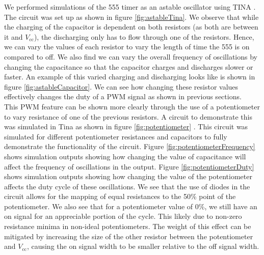 \documentclass[%
 reprint,
 amsmath,amssymb,
 aps,
]{revtex4-2}
\begin{document}
        We performed simulations of the 555 timer as an astable oscillator using TINA \cite{tina}. The circuit was set up as shown in figure \ref{fig:astableTina}. We observe that while the charging of the capacitor is dependent on both  resistors (as both are between it and $V_\text{cc}$), the discharging only has to flow through one of the resistors. Hence, we can vary the values of each resistor to vary the length of time the 555 is on compared to off. We also find we can vary the overall frequency of oscillations by changing the capacitance so that the capacitor charges and discharges slower or faster. An example of this varied charging and discharging looks like is shown in figure \ref{fig:astableCapacitor}. We can see how changing these resistor values effectively changes the duty of a PWM signal as shown in previous sections.\\

        This PWM feature can be shown more clearly through the use of a potentiometer to vary resistance of one of the previous resistors. A circuit to demonstrate this was simulated in Tina as shown in figure \ref{fig:potentiometer} \cite{tina}. This circuit was simulated for different potentiometer resistances and capacitors to fully demonstrate the functionality of the circuit. Figure \ref{fig:potentiometerFrequency} shows simulation outputs showing how changing the value of capacitance will affect the frequency of oscillations in the output. Figure \ref{fig:potentiometerDuty} shows simulation outputs showing how changing the value of the potentiometer affects the duty cycle of these oscillations. We see that the use of diodes in the circuit allows for the mapping of equal resistances to the 50\% point of the potentiometer. We also see that for a potentiometer value of 0\%, we still have an on signal for an appreciable portion of the cycle. This likely due to non-zero resistance minima in non-ideal potentiometers. The weight of this effect can be mitigated by increasing the size of the other resistor between the potentiometer and $V_\text{cc}$, causing the on signal width to be smaller relative to the off signal width.
\end{document}

